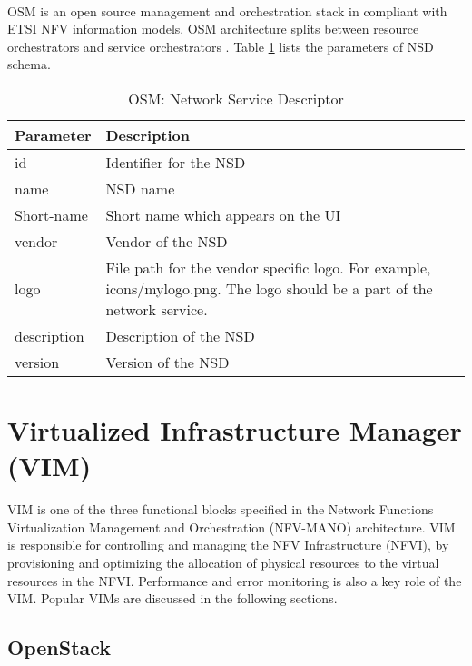 \paragraph{}
OSM is an open source management and orchestration stack in compliant with ETSI NFV information models. OSM architecture splits between resource orchestrators and service orchestrators \cite{de2018network}. Table \ref{tab:OSM_nsd} lists the parameters of NSD schema. \cite{OSMSchemaDocumentation}
    \begin{table}[h]
        \centering
    \begin{tabular}{ |p{4cm}|p{10cm}|}
        \hline
        \textbf{Parameter} & \textbf{Description} \\
        \hline
         
         id &   Identifier for the NSD \\
         \hline
         name & NSD name \\
         \hline
         Short-name &   Short name which appears on the UI \\
         \hline
         vendor &   Vendor of the NSD \\
         \hline
         logo & File path for the vendor specific logo. For example, icons/mylogo.png. The logo should be a part of the network service. \\
         \hline
         description &  Description of the NSD \\
         \hline
         version &  Version of the NSD \\
         \hline
    \end{tabular}
        \caption{OSM: Network Service Descriptor}
    \label{tab:OSM_nsd}
 \end{table}



\newpage
\section{Virtualized Infrastructure Manager (VIM)}
VIM is one of the three functional blocks specified in the Network Functions Virtualization Management and Orchestration (NFV-MANO) architecture. VIM is responsible for controlling and managing the NFV Infrastructure (NFVI), by provisioning and optimizing the allocation of physical resources to the virtual resources in the NFVI. Performance and error monitoring is also a key role of the VIM. Popular VIMs are discussed in the following sections.
\subsection{OpenStack}

